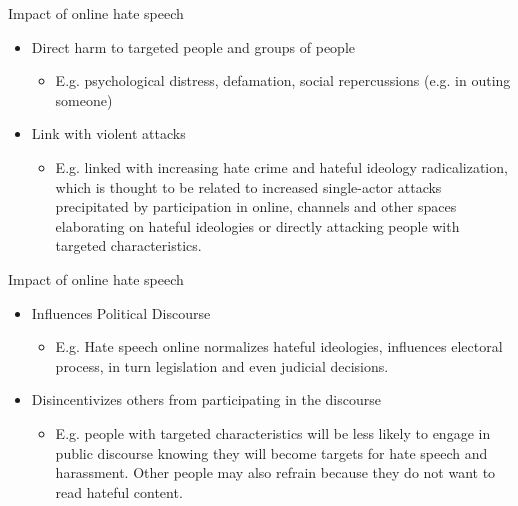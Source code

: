 \documentclass[nobackground,dvipsnames,table]{beamer}
\begin{document}
\begin{frame}{Impact of online hate speech}

\begin{itemize}
    \item Direct harm to targeted people and groups of people 

    \begin{itemize}
        \item E.g. psychological distress, defamation, social repercussions (e.g. in outing someone) 
    \end{itemize}

    \item Link with violent attacks
    \begin{itemize}
        \item E.g. linked with increasing hate crime and hateful ideology radicalization, which is thought to be related to increased single-actor attacks precipitated by participation in online, channels and other spaces elaborating on hateful ideologies or directly attacking people with targeted characteristics. 
    \end{itemize} 
\end{itemize}

\end{frame}

\begin{frame}{Impact of online hate speech}

\begin{itemize}
    \item Influences Political Discourse 

    \begin{itemize}
        \item E.g. Hate speech online normalizes hateful ideologies, influences electoral process, in turn legislation and even judicial decisions. 
    \end{itemize}

    \item Disincentivizes others from participating in the discourse 
    \begin{itemize}
        \item E.g. people with targeted characteristics will be less likely to engage in public discourse knowing they will become targets for hate speech and harassment. Other people may also refrain because they do not want to read hateful content. 
    \end{itemize} 
\end{itemize}

\end{frame}
\end{document}
